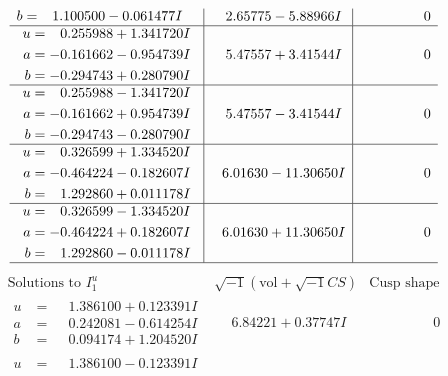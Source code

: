 \documentclass[1p]{elsarticle_modified}
\theoremstyle{definition}
\newcommand{\I}{\sqrt{-1}}
\begin{document}
$$\begin{array}{c|c|c}
\begin{aligned}
b &= \phantom{-}1.100500 - 0.061477 I\end{aligned}
 & \phantom{-}2.65775 - 5.88966 I & \phantom{-0.000000 } 0 \\ \hline\begin{aligned}
u &= \phantom{-}0.255988 + 1.341720 I \\
a &= -0.161662 - 0.954739 I \\
b &= -0.294743 + 0.280790 I\end{aligned}
 & \phantom{-}5.47557 + 3.41544 I & \phantom{-0.000000 } 0 \\ \hline\begin{aligned}
u &= \phantom{-}0.255988 - 1.341720 I \\
a &= -0.161662 + 0.954739 I \\
b &= -0.294743 - 0.280790 I\end{aligned}
 & \phantom{-}5.47557 - 3.41544 I & \phantom{-0.000000 } 0 \\ \hline\begin{aligned}
u &= \phantom{-}0.326599 + 1.334520 I \\
a &= -0.464224 - 0.182607 I \\
b &= \phantom{-}1.292860 + 0.011178 I\end{aligned}
 & \phantom{-}6.01630 - 11.30650 I & \phantom{-0.000000 } 0 \\ \hline\begin{aligned}
u &= \phantom{-}0.326599 - 1.334520 I \\
a &= -0.464224 + 0.182607 I \\
b &= \phantom{-}1.292860 - 0.011178 I\end{aligned}
 & \phantom{-}6.01630 + 11.30650 I & \phantom{-0.000000 } 0\\
 \hline 
 \end{array}$$\newpage$$\begin{array}{c|c|c}  
\text{Solutions to }I^u_{1}& \I (\text{vol} + \sqrt{-1}CS) & \text{Cusp shape}\\
 \hline 
\begin{aligned}
u &= \phantom{-}1.386100 + 0.123391 I \\
a &= \phantom{-}0.242081 - 0.614254 I \\
b &= \phantom{-}0.094174 + 1.204520 I\end{aligned}
 & \phantom{-}6.84221 + 0.37747 I & \phantom{-0.000000 } 0 \\ \hline\begin{aligned}
u &= \phantom{-}1.386100 - 0.123391 I \\

\end{aligned}
\end{array}$$
\end{document}
